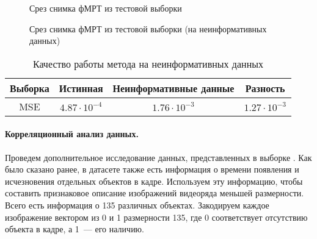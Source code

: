 \documentclass[a4paper, 12pt]{extarticle}
\begin{document}
\begin{figure}[h!]
	\centering
	\hfill
	\hfill
	\caption{Срез снимка фМРТ из тестовой выборки}
	\label{fig:recover}
\end{figure}

\begin{figure}[h!]
	\centering
	\hfill
	\hfill
	\caption{Срез снимка фМРТ из тестовой выборки (на неинформативных данных)}
	\label{fig:random}
\end{figure}

\begin{table}[h!]
	\centering
	\caption{Качество работы метода на неинформативных данных}
	\begin{tabular}{|c|c|c|c|}
		\hline
		Выборка & Истинная          & Неинформативные данные & Разность \\ \hline \hline
		MSE     & $4.87 \cdot 10^{-4}$ & $1.76 \cdot 10^{-3}$ & $1.27 \cdot 10^{-3}$ \\ \hline
	\end{tabular}
	\label{table:random}
\end{table}


\paragraph*{Корреляционный анализ данных.}

Проведем дополнительное исследование данных, представленных в выборке \citep{Berezutskaya2022}.
Как было сказано ранее, в датасете также есть информация о времени появления
и исчезновения отдельных объектов в кадре. Используем эту информацию, чтобы составить признаковое
описание изображений видеоряда меньшей размерности. Всего есть информация о 135 различных объектах.
Закодируем каждое изображение вектором из 0 и 1 размерности 135, где 0 соответствует отсутствию
объекта в кадре, а 1~--- его наличию.
\end{document}
